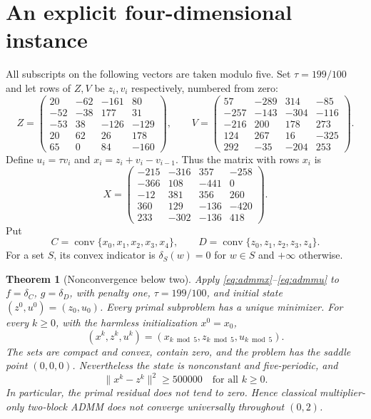 \documentclass[11pt,a4paper]{article}
\newtheorem{theorem}{Theorem}
\theoremstyle{remark}
\newcommand{\conv}{\operatorname{conv}}
\newcommand{\norm}[1]{\lVert #1\rVert}
\begin{document}
\section{An explicit four-dimensional instance}\label{sec:instance}
All subscripts on the following vectors are taken modulo five. Set $\tau=199/100$ and let rows of $Z,V$ be $z_i,v_i$ respectively, numbered from zero:
\begin{equation}\label{eq:dataZ}
Z=\begin{pmatrix}
20&-62&-161&80\\-52&-38&177&31\\-53&38&-126&-129\\20&62&26&178\\65&0&84&-160
\end{pmatrix},\qquad
V=\begin{pmatrix}
57&-289&314&-85\\-257&-143&-304&-116\\-216&200&178&273\\124&267&16&-325\\292&-35&-204&253
\end{pmatrix}.
\end{equation}
Define $u_i=\tau v_i$ and $x_i=z_i+v_i-v_{i-1}$. Thus the matrix with rows $x_i$ is
\begin{equation}\label{eq:dataX}
X=\begin{pmatrix}
-215&-316&357&-258\\-366&108&-441&0\\-12&381&356&260\\360&129&-136&-420\\233&-302&-136&418
\end{pmatrix}.
\end{equation}
Put
\begin{equation}\label{eq:sets}
C=\conv\{x_0,x_1,x_2,x_3,x_4\},\qquad
D=\conv\{z_0,z_1,z_2,z_3,z_4\}.
\end{equation}
For a set $S$, its convex indicator is $\delta_S(w)=0$ for $w\in S$ and $+\infty$ otherwise.

\begin{theorem}[Nonconvergence below two]\label{thm:main}
Apply \eqref{eq:admmx}--\eqref{eq:admmu} to $f=\delta_C$, $g=\delta_D$, with penalty one, $\tau=199/100$, and initial state $(z^0,u^0)=(z_0,u_0)$. Every primal subproblem has a unique minimizer. For every $k\ge0$, with the harmless initialization $x^0=x_0$,
\[
(x^k,z^k,u^k)=(x_{k\bmod5},z_{k\bmod5},u_{k\bmod5}).
\]
The sets are compact and convex, contain zero, and the problem has the saddle point $(0,0,0)$. Nevertheless the state is nonconstant and five-periodic, and
\[
\norm{x^k-z^k}^2\ge 500000\quad\text{for all }k\ge0.
\]
In particular, the primal residual does not tend to zero. Hence classical multiplier-only two-block ADMM does not converge universally throughout $(0,2)$.
\end{theorem}
\end{document}
